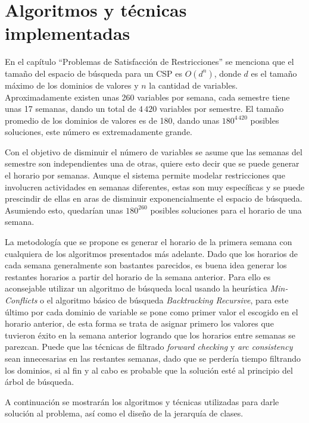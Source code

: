 \section{Algoritmos y t\'ecnicas implementadas}

En el cap\'itulo ``Problemas de Satisfacci\'on de Restricciones'' se menciona que el tamaño del espacio de b\'usqueda para un CSP es $O(d^{n})$, donde $d$ es el tamaño m\'aximo de los dominios de valores y $n$ la cantidad de variables. Aproximadamente existen unas 260 variables por semana, cada semestre tiene unas 17 semanas, dando un total de $4\,420$ variables por semestre. El tamaño promedio de los dominios de valores es de 180, dando unas $180^{4\,420}$ posibles soluciones, este n\'umero es extremadamente grande.

Con el objetivo de disminuir el n\'umero de variables se asume que las semanas del semestre son independientes una de otras, quiere esto decir que se puede generar el horario por semanas. Aunque el sistema permite modelar restricciones que involucren actividades en semanas diferentes, estas son muy espec\'ificas y se puede prescindir de ellas en aras de disminuir exponencialmente el espacio de b\'usqueda. Asumiendo esto, quedar\'ian unas $180^{260}$ posibles soluciones para el horario de una semana.

La metodolog\'ia que se propone es generar el horario de la primera semana con cualquiera de los algoritmos presentados m\'as adelante. Dado que los horarios de cada semana generalmente son bastantes parecidos, es buena idea generar los restantes horarios a partir del horario de la semana anterior. Para ello es aconsejable utilizar un algoritmo de b\'usqueda local usando la heur\'istica \emph{Min-Conflicts} o el algoritmo b\'asico de b\'usqueda \emph{Backtracking Recursive}, para este \'ultimo por cada dominio de variable se pone como primer valor el escogido en el horario anterior, de esta forma se trata de asignar primero los valores que tuvieron \'exito en la semana anterior logrando que los horarios entre semanas se parezcan. Puede que las t\'ecnicas de filtrado \emph{forward checking} y \emph{arc consistency} sean innecesarias en las restantes semanas, dado que se perder\'ia tiempo filtrando los dominios, si al fin y al cabo es probable que la soluci\'on est\'e al principio del \'arbol de b\'usqueda.

A continuaci\'on se mostrar\'an los algoritmos y t\'ecnicas utilizadas para darle soluci\'on al problema, as\'i como el diseño de la jerarqu\'ia de clases.

